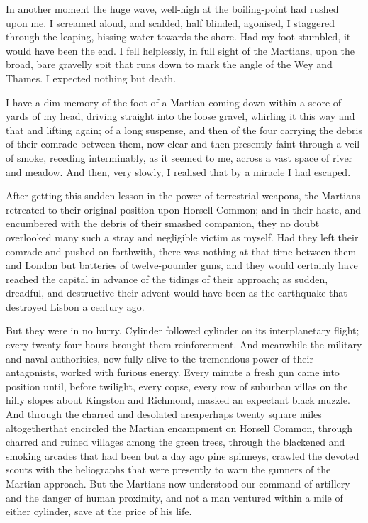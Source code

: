 In another moment the huge wave, well-nigh at the boiling-point had
rushed upon me. I screamed aloud, and scalded, half blinded,
agonised, I staggered through the leaping, hissing water towards
the shore. Had my foot stumbled, it would have been the end. I fell
helplessly, in full sight of the Martians, upon the broad, bare
gravelly spit that runs down to mark the angle of the Wey and
Thames. I expected nothing but death.

I have a dim memory of the foot of a Martian coming down within a
score of yards of my head, driving straight into the loose gravel,
whirling it this way and that and lifting again; of a long
suspense, and then of the four carrying the debris of their comrade
between them, now clear and then presently faint through a veil of
smoke, receding interminably, as it seemed to me, across a vast
space of river and meadow. And then, very slowly, I realised that
by a miracle I had escaped.

After getting this sudden lesson in the power of terrestrial
weapons, the Martians retreated to their original position upon
Horsell Common; and in their haste, and encumbered with the debris
of their smashed companion, they no doubt overlooked many such a
stray and negligible victim as myself. Had they left their comrade
and pushed on forthwith, there was nothing at that time between
them and London but batteries of twelve-pounder guns, and they
would certainly have reached the capital in advance of the tidings
of their approach; as sudden, dreadful, and destructive their
advent would have been as the earthquake that destroyed Lisbon a
century ago.

But they were in no hurry. Cylinder followed cylinder on its
interplanetary flight; every twenty-four hours brought them
reinforcement. And meanwhile the military and naval authorities,
now fully alive to the tremendous power of their antagonists,
worked with furious energy. Every minute a fresh gun came into
position until, before twilight, every copse, every row of suburban
villas on the hilly slopes about Kingston and Richmond, masked an
expectant black muzzle. And through the charred and desolated
area\dash{}perhaps twenty square miles altogether\dash{}that encircled the
Martian encampment on Horsell Common, through charred and ruined
villages among the green trees, through the blackened and smoking
arcades that had been but a day ago pine spinneys, crawled the
devoted scouts with the heliographs that were presently to warn the
gunners of the Martian approach. But the Martians now understood
our command of artillery and the danger of human proximity, and not
a man ventured within a mile of either cylinder, save at the price
of his life.

